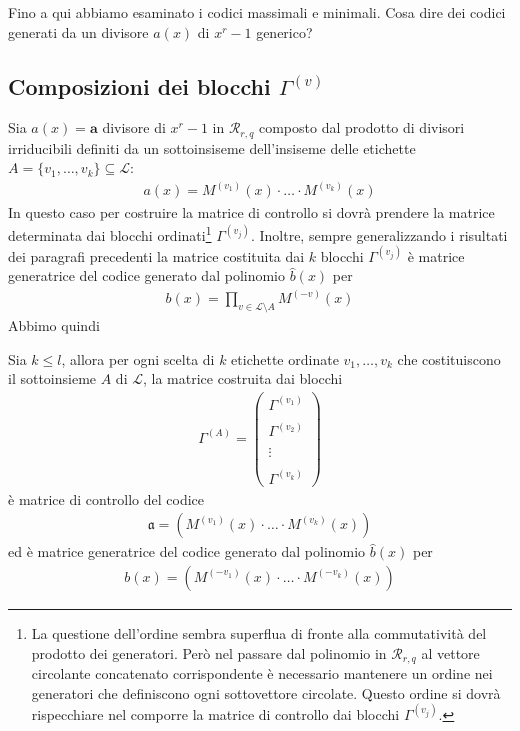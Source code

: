 Fino a qui abbiamo esaminato i codici massimali e minimali. Cosa dire dei codici generati da un divisore $a(x)$ di $x^r - 1$ generico?

\subsection{Composizioni dei blocchi $\Gamma^{(v)}$}

Sia $a(x)=\mathbf{a}$ divisore di $x^{r} - 1$ in $\mathcal{R}_{r,q} $ composto dal prodotto di divisori irriducibili definiti da un sottoinsiseme dell'insiseme delle etichette $A = \lbrace v_{1}, \dots, v_{k} \rbrace \subseteq \mathscr{L} $:
\begin{align*}
   a(x) = M^{(v_{1})}(x)\cdot \dots \cdot M^{(v_{k})}(x)
\end{align*}
In questo caso per costruire la matrice di controllo si dovrà prendere la matrice determinata dai blocchi ordinati\footnote{La questione dell'ordine sembra superflua di fronte alla commutatività del prodotto dei generatori. Però nel passare dal polinomio in $\mathcal{R}_{r,q}$ al vettore circolante concatenato corrispondente è necessario mantenere un ordine nei generatori che definiscono ogni sottovettore circolate. Questo ordine si dovrà rispecchiare nel comporre la matrice di controllo dai blocchi $\Gamma^{(v_{j})}$.} $\Gamma^{(v_{j})}$. Inoltre, sempre generalizzando i risultati dei paragrafi precedenti la matrice costituita dai $k$ blocchi $\Gamma^{(v_{j})}$ è matrice generatrice del codice generato dal polinomio $\hat{b}(x)$ per
\begin{align*}
   b(x) = \prod_{v \in \mathscr{L} \setminus A } M^{(-v)}(x)
\end{align*}
Abbimo quindi
\begin{corollario}
   Sia $k \leq l$, allora per ogni scelta di $k$ etichette ordinate $v_{1}, \dots, v_{k}$ che costituiscono il sottoinsieme $A$ di $\mathscr{L}$, la matrice costruita dai blocchi
   \begin{align*}
      \Gamma^{(A)}
      =
      \left(
      \begin{array} { c }
      \Gamma^{(v_{1})}  \\ \\
      \Gamma^{(v_{2})} \\ \\
      \vdots \\ \\
      \Gamma^{(v_{k})}
      \end{array}
      \right)
   \end{align*}
   è matrice di controllo del codice
   \begin{align*}
    \mathfrak{a} = (  M^{(v_{1})}(x)\cdot \dots \cdot M^{(v_{k})}(x) )
  \end{align*}
  ed è matrice generatrice del codice generato dal polinomio $\hat{b}(x)$ per
  \begin{align*}
    b(x) = (  M^{(-v_{1})}(x)\cdot \dots \cdot M^{(-v_{k})}(x) )
  \end{align*}
\end{corollario}
